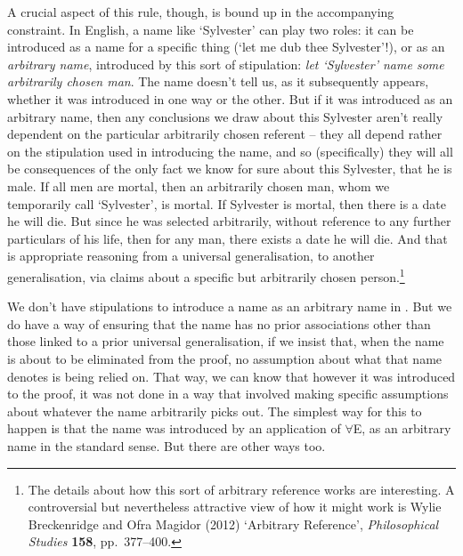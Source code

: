 A crucial aspect of this rule, though, is bound up in the accompanying constraint. In English, a name like `Sylvester' can play two roles: it can be introduced as a name for a specific thing (`let me dub thee Sylvester'!), or as an \emph{arbitrary name}, introduced by this sort of stipulation: \emph{let `Sylvester' name some arbitrarily chosen man}. The name doesn't tell us, as it subsequently appears, whether it was introduced in one way or the other. But if it was introduced as an arbitrary name, then any conclusions we draw about this Sylvester aren't really dependent on the particular arbitrarily chosen referent – they all depend rather on the stipulation used in introducing the name, and so (specifically) they will all be consequences of the only fact we know for sure about this Sylvester, that he is male. If all men are mortal, then an arbitrarily chosen man, whom we temporarily call `Sylvester', is mortal. If Sylvester is mortal, then there is a date he will die. But since he was selected arbitrarily, without reference to any further particulars of his life, then for any man, there exists a date he will die. And that is appropriate reasoning from a universal generalisation, to another generalisation, via claims about a specific but arbitrarily chosen person.\footnote{The details about how this sort of arbitrary reference works are interesting. A controversial but nevertheless attractive view of how it might work is  Wylie Breckenridge and Ofra Magidor (2012) `Arbitrary Reference', \emph{Philosophical Studies} \textbf{158}, pp.\ 377–400.}

We don't have stipulations to introduce a name as an arbitrary name in \FOL. But we do have a way of ensuring that the name has no prior associations other than those linked to a prior universal generalisation, if we insist that,  when the name is about to be eliminated from the proof, no assumption about what that name denotes is being relied on. That way, we can know that however it was introduced to the proof, it was not done in a way that involved making specific assumptions about whatever the name arbitrarily picks out. The simplest way for this to happen is that the name was introduced by an application of $\forall$E, as an arbitrary name in the standard sense. But there are other ways too.  

